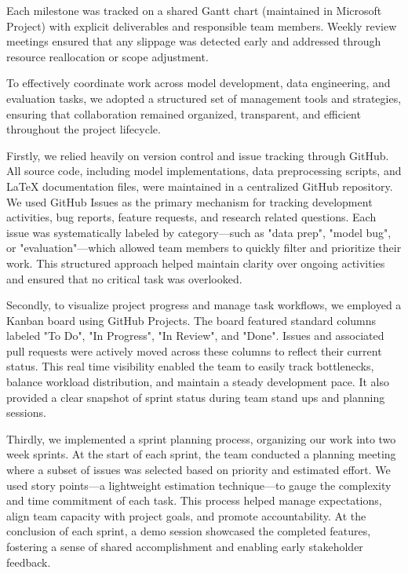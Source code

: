 \documentclass{article}
\begin{document}
Each milestone was tracked on a shared Gantt chart (maintained in Microsoft Project) with explicit deliverables and responsible team members. Weekly review meetings ensured that any slippage was detected early and addressed through resource reallocation or scope adjustment.



To effectively coordinate work across model development, data engineering, and evaluation tasks, we adopted a structured set of management tools and strategies, ensuring that collaboration remained organized, transparent, and efficient throughout the project lifecycle.

Firstly, we relied heavily on version control and issue tracking through GitHub. All source code, including model implementations, data preprocessing scripts, and LaTeX documentation files, were maintained in a centralized GitHub repository. We used GitHub Issues as the primary mechanism for tracking development activities, bug reports, feature requests, and research related questions. Each issue was systematically labeled by category—such as "data prep", "model bug", or "evaluation"—which allowed team members to quickly filter and prioritize their work. This structured approach helped maintain clarity over ongoing activities and ensured that no critical task was overlooked.

Secondly, to visualize project progress and manage task workflows, we employed a Kanban board using GitHub Projects. The board featured standard columns labeled "To Do", "In Progress", "In Review", and "Done". Issues and associated pull requests were actively moved across these columns to reflect their current status. This real time visibility enabled the team to easily track bottlenecks, balance workload distribution, and maintain a steady development pace. It also provided a clear snapshot of sprint status during team stand ups and planning sessions.

Thirdly, we implemented a sprint planning process, organizing our work into two week sprints. At the start of each sprint, the team conducted a planning meeting where a subset of issues was selected based on priority and estimated effort. We used story points—a lightweight estimation technique—to gauge the complexity and time commitment of each task. This process helped manage expectations, align team capacity with project goals, and promote accountability. At the conclusion of each sprint, a demo session showcased the completed features, fostering a sense of shared accomplishment and enabling early stakeholder feedback.
\end{document}
